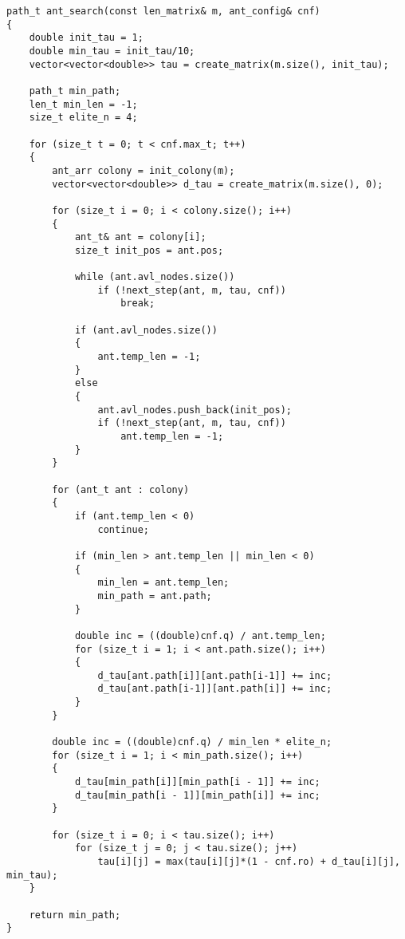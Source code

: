 \begin{lstlisting}[caption = {Поиск муравьиным алгоритмом (главная функция)}]
path_t ant_search(const len_matrix& m, ant_config& cnf)
{
	double init_tau = 1;
	double min_tau = init_tau/10;
	vector<vector<double>> tau = create_matrix(m.size(), init_tau);
	
	path_t min_path;
	len_t min_len = -1;
	size_t elite_n = 4;
	
	for (size_t t = 0; t < cnf.max_t; t++)
	{	
		ant_arr colony = init_colony(m);
		vector<vector<double>> d_tau = create_matrix(m.size(), 0);
		
		for (size_t i = 0; i < colony.size(); i++)
		{
			ant_t& ant = colony[i];
			size_t init_pos = ant.pos;
			
			while (ant.avl_nodes.size())
				if (!next_step(ant, m, tau, cnf)) 
					break;
			
			if (ant.avl_nodes.size())
			{ 
				ant.temp_len = -1;
			}
			else
			{
				ant.avl_nodes.push_back(init_pos);
				if (!next_step(ant, m, tau, cnf)) 
					ant.temp_len = -1;
			}
		}
		
		for (ant_t ant : colony)
		{
			if (ant.temp_len < 0)
				continue;

			if (min_len > ant.temp_len || min_len < 0)
			{
				min_len = ant.temp_len;
				min_path = ant.path;
			}
			
			double inc = ((double)cnf.q) / ant.temp_len;
			for (size_t i = 1; i < ant.path.size(); i++)
			{
				d_tau[ant.path[i]][ant.path[i-1]] += inc;
				d_tau[ant.path[i-1]][ant.path[i]] += inc;
			}
		}
		
		double inc = ((double)cnf.q) / min_len * elite_n;
		for (size_t i = 1; i < min_path.size(); i++)
		{
			d_tau[min_path[i]][min_path[i - 1]] += inc;
			d_tau[min_path[i - 1]][min_path[i]] += inc;
		}
		
		for (size_t i = 0; i < tau.size(); i++)
			for (size_t j = 0; j < tau.size(); j++)
				tau[i][j] = max(tau[i][j]*(1 - cnf.ro) + d_tau[i][j], min_tau);
	}
	
	return min_path;
}
\end{lstlisting}

